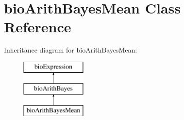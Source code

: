 \hypertarget{classbio_arith_bayes_mean}{}\section{bio\+Arith\+Bayes\+Mean Class Reference}
\label{classbio_arith_bayes_mean}
Inheritance diagram for bio\+Arith\+Bayes\+Mean\+:\begin{figure}[H]
\begin{center}
\leavevmode
\includegraphics[height=3.000000cm]{classbio_arith_bayes_mean}
\end{center}
\end{figure}
